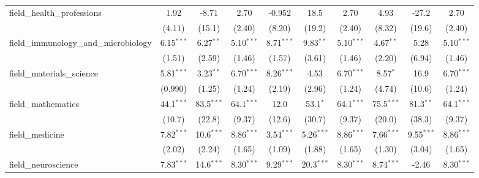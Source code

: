 \begin{tabular}{lccccccccc}
   field\_health\_professions                                  & 1.92          & -8.71         & 2.70          & -0.952        & 18.5           & 2.70          & 4.93          & -27.2          & 2.70\\   
                                                               & (4.11)        & (15.1)        & (2.40)        & (8.20)        & (19.2)         & (2.40)        & (8.32)        & (19.6)         & (2.40)\\   
   field\_immunology\_and\_microbiology                        & 6.15$^{***}$  & 6.27$^{**}$   & 5.10$^{***}$  & 8.71$^{***}$  & 9.83$^{**}$    & 5.10$^{***}$  & 4.67$^{**}$   & 5.28           & 5.10$^{***}$\\   
                                                               & (1.51)        & (2.59)        & (1.46)        & (1.57)        & (3.61)         & (1.46)        & (2.20)        & (6.94)         & (1.46)\\   
   field\_materials\_science                                   & 5.81$^{***}$  & 3.23$^{**}$   & 6.70$^{***}$  & 8.26$^{***}$  & 4.53           & 6.70$^{***}$  & 8.57$^{*}$    & 16.9           & 6.70$^{***}$\\   
                                                               & (0.990)       & (1.25)        & (1.24)        & (2.19)        & (2.96)         & (1.24)        & (4.74)        & (10.6)         & (1.24)\\   
   field\_mathematics                                          & 44.1$^{***}$  & 83.5$^{***}$  & 64.1$^{***}$  & 12.0          & 53.1$^{*}$     & 64.1$^{***}$  & 75.5$^{***}$  & 81.3$^{**}$    & 64.1$^{***}$\\   
                                                               & (10.7)        & (22.8)        & (9.37)        & (12.6)        & (30.7)         & (9.37)        & (20.0)        & (38.3)         & (9.37)\\   
   field\_medicine                                             & 7.82$^{***}$  & 10.6$^{***}$  & 8.86$^{***}$  & 3.54$^{***}$  & 5.26$^{***}$   & 8.86$^{***}$  & 7.66$^{***}$  & 9.55$^{***}$   & 8.86$^{***}$\\   
                                                               & (2.02)        & (2.24)        & (1.65)        & (1.09)        & (1.88)         & (1.65)        & (1.30)        & (3.04)         & (1.65)\\   
   field\_neuroscience                                         & 7.83$^{***}$  & 14.6$^{***}$  & 8.30$^{***}$  & 9.29$^{***}$  & 20.3$^{***}$   & 8.30$^{***}$  & 8.74$^{***}$  & -2.46          & 8.30$^{***}$\\   

\end{tabular}
